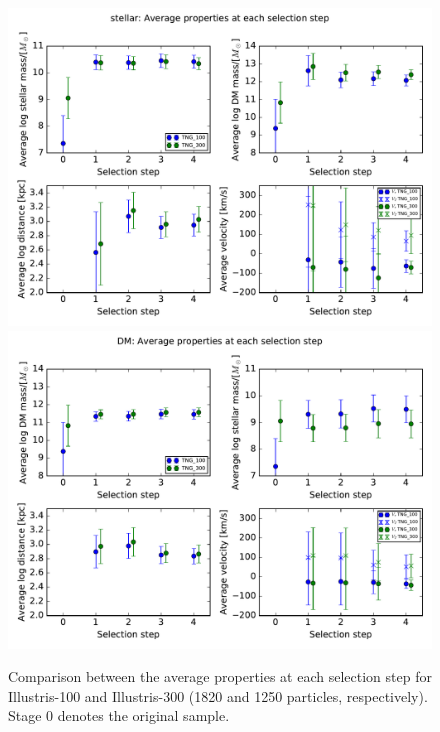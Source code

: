 \documentclass[fleqn,usenatbib]{mnras}
\begin{document}
\begin{figure}
\centering
\includegraphics[scale=0.4]{avgProp/stellar_avgPropsTNG_100TNG_300.pdf}
\includegraphics[scale=0.4]{avgProp/DM_avgPropsTNG_100TNG_300.pdf}
\caption{\label{fig:prop_100_300} Comparison between the average properties at each selection step for Illustris-100 and Illustris-300 (1820 and 1250 particles, respectively). Stage $0$ denotes the original sample.}
\end{figure}
\end{document}
